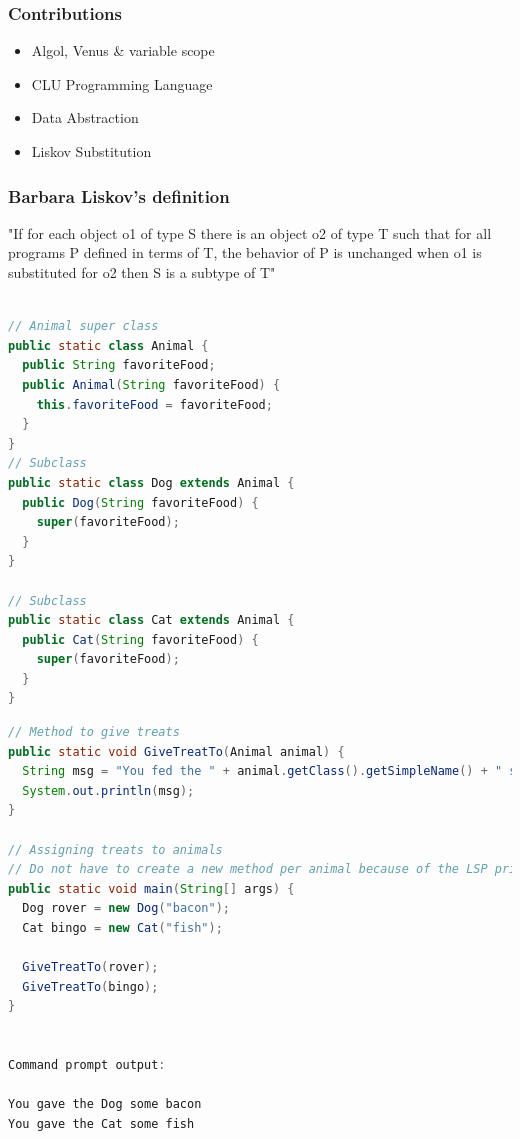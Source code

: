 \documentclass{beamer}
\begin{document}

\begin{frame}
\frametitle{Contributions}
\begin{itemize}
\item Algol, Venus & variable scope
\item CLU Programming Language
\item Data Abstraction
\item Liskov Substitution

\end{itemize}
\end{frame}


\begin{frame}
\frametitle{Barbara Liskov's definition}
"If for each object o1 of type S there is an object o2 of type T such that for all programs P defined in terms of T, the behavior of P is unchanged when o1 is substituted for o2 then S is a subtype of T"
\end{frame}




\vspace{5mm}

\begin{lstlisting}[language=Java]

// Animal super class 
public static class Animal {
  public String favoriteFood;
  public Animal(String favoriteFood) {
    this.favoriteFood = favoriteFood;
  }
}
// Subclass
public static class Dog extends Animal {
  public Dog(String favoriteFood) {
    super(favoriteFood);
  }
}

// Subclass
public static class Cat extends Animal {
  public Cat(String favoriteFood) {
    super(favoriteFood);
  }
}
\end{lstlisting}

\vspace{5mm}



\vspace{5mm}

\begin{lstlisting}[language=Java]
// Method to give treats
public static void GiveTreatTo(Animal animal) {
  String msg = "You fed the " + animal.getClass().getSimpleName() + " some "  + animal.favoriteFood;
  System.out.println(msg);
}

// Assigning treats to animals
// Do not have to create a new method per animal because of the LSP principle
public static void main(String[] args) {
  Dog rover = new Dog("bacon");
  Cat bingo = new Cat("fish");

  GiveTreatTo(rover);
  GiveTreatTo(bingo);
}


Command prompt output:

You gave the Dog some bacon
You gave the Cat some fish
\end{lstlisting}
\end{document}
